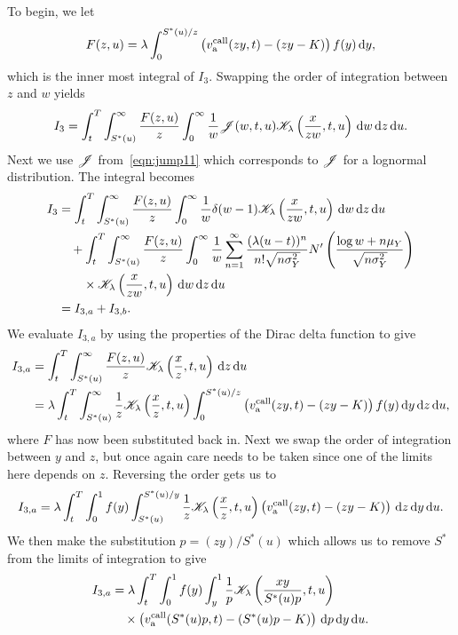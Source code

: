 	To begin, we let
		$$
			F(z,u) = \lambda\int_{0}^{S^*(u)/z}  \left( v_{\text{a}}^{\text{call}}(zy,t) - (zy-K) \right)f(y) \, \mathrm d y,
		$$
	which is the inner most integral of $I_3$. Swapping the order of integration between $z$ and $w$ yields
		$$
			I_3 = \int_t^T\int_{S^*(u)}^\infty \frac{F(z,u)}{z} \int_0^\infty  \frac{1}{w}\mathscr J(w,t,u)\mathscr K_\lambda\left( \frac{x}{zw},t,u \right) \, \mathrm d w \, \mathrm d z \, \mathrm d u. 
		$$
	Next we use $\mathscr J$ from~\eqref{eqn:jump11} which corresponds to $\mathscr J$ for a lognormal distribution. The integral becomes
		\begin{align*}
			I_3 &= \int_t^T\int_{S^*(u)}^\infty \frac{F(z,u)}{z} \int_0^\infty  \frac{1}{w}\delta(w-1)\mathscr K_\lambda\left( \frac{x}{zw},t,u \right) \, \mathrm d w \, \mathrm d z \, \mathrm d u \\
			& \quad {} + \int_t^T\int_{S^*(u)}^\infty \frac{F(z,u)}{z} \int_0^\infty  \frac{1}{w}  \displaystyle\sum\limits_{n=1}^{\infty} \frac{(\lambda(u-t))^n}{n!\sqrt{n\sigma_Y^2}} N'\left( \frac{\log w + n\mu_Y}{\sqrt{n\sigma_Y^2}} \right) \\
			&\quad \quad {} \times \mathscr K_\lambda\left( \frac{x}{zw},t,u \right) \, \mathrm d w \, \mathrm d z \, \mathrm d u \\
			&= I_{3,a} + I_{3,b}.
		\end{align*} 
	We evaluate $I_{3,a}$ by using the properties of the Dirac delta function to give
		\begin{align*}
			I_{3,a} &= \int_t^T \int_{S^*(u)}^\infty \frac{F(z,u)}{z}\mathscr K_\lambda\left( \frac{x}{z},t,u \right) \, \mathrm d z \, \mathrm d u \\
			&= \lambda  \int_t^T \int_{S^*(u)}^\infty \frac{1}{z}\mathscr K_\lambda\left( \frac{x}{z},t,u \right) \int_0^{S^*(u)/z}  \left( v_{\text{a}}^{\text{call}}(zy,t) - (zy-K) \right)f(y) \, \mathrm d y \, \mathrm d z \, \mathrm d u,
		\end{align*}
	where $F$ has now been substituted back in. Next we swap the order of integration between $y$ and $z$, but once again care needs to be taken since one of the limits here depends on $z$. Reversing the order gets us to
		$$
			I_{3,a} = \lambda  \int_t^T \int_0^1 f(y) \int_{S^*(u)}^{S^*(u)/y} \frac{1}{z}\mathscr K_\lambda\left( \frac{x}{z},t,u \right)  \left( v_{\text{a}}^{\text{call}}(zy,t) - (zy-K) \right) \, \mathrm d z \, \mathrm d y \, \mathrm d u.
		$$
	We then make the substitution $p = (zy)/S^*(u)$ which allows us to remove $S^*$ from the limits of integration to give
		\begin{align*}
			I_{3,a} &=  \lambda  \int_t^T \int_0^1 f(y) \int_y^1 \frac{1}{p}\mathscr K_\lambda\left( \frac{xy}{S^*(u)p},t,u \right)  \\
			&\quad {} \times \left( v_{\text{a}}^{\text{call}}(S^*(u)p,t) - (S^*(u)p-K) \right) \, \mathrm d p \, \mathrm d y \, \mathrm d u.
		\end{align*}
